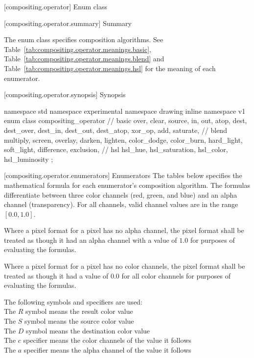  [compositing.operator] {Enum class }

 [compositing.operator.summary] { 
Summary}

\pnum
The  enum class specifies composition algorithms. See Table~\ref{tab:compositing.operator.meanings.basic}, 
Table~\ref{tab:compositing.operator.meanings.blend} and 
Table~\ref{tab:compositing.operator.meanings.hsl} for the meaning of 
each  enumerator.

 [compositing.operator.synopsis] { 
Synopsis}

\begin{codeblock}
namespace std { namespace experimental { namespace drawing { inline namespace 
v1 {
  enum class compositing_operator {
    // basic
    over,
    clear,
    source,
    in,
    out,
    atop,
    dest,
    dest_over,
    dest_in,
    dest_out,
    dest_atop,
    xor_op,
    add,
    saturate,
    // blend
    multiply,
    screen,
    overlay,
    darken,
    lighten,
    color_dodge,
    color_burn,
    hard_light,
    soft_light,
    difference,
    exclusion,
    // hsl
    hsl_hue,
    hsl_saturation,
    hsl_color,
    hsl_luminosity
  };
} } } }
\end{codeblock}

 [compositing.operator.enumerators] { 
Enumerators}
\pnum
The tables below specifies the mathematical formula for each enumerator's composition algorithm. The formulas differentiate between three color channels (red, green, and blue) and an alpha channel (transparency). For all channels, valid channel values are in the range $[0.0, 1.0]$.

\pnum
Where a pixel format for a pixel has no alpha channel, the pixel format shall be treated as though it had an alpha channel with a value of $1.0$ for purposes of evaluating the formulas.

\pnum
Where a pixel format for a pixel has no color channels, the pixel format shall be treated as though it had a value of $0.0$ for all color channels for purposes of evaluating the formulas.

\pnum
The following symbols and specifiers are used:\\
\hspace*{1em}The $R$ symbol means the result color value\\
\hspace*{1em}The $S$ symbol means the source color value\\
\hspace*{1em}The $D$ symbol means the destination color value\\
\hspace*{1em}The $c$ specifier means the color channels of the value it 
follows\\
\hspace*{1em}The $a$ specifier means the alpha channel of the value it follows\\

